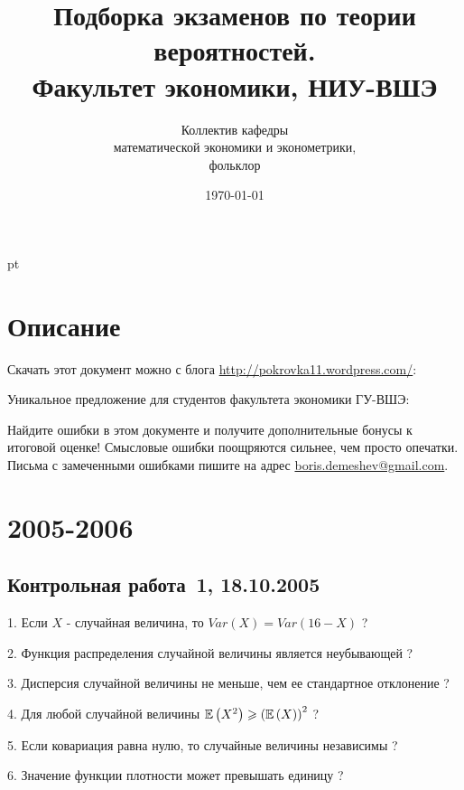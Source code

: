 \documentclass[pdftex,12pt,a4paper]{article}
\title{Подборка экзаменов по теории вероятностей. \\Факультет экономики, НИУ-ВШЭ}
\date{\today}
\author{Коллектив кафедры \\
математической экономики и эконометрики,\\
 фольклор}
\begin{document}
\maketitle

\tableofcontents{}


 pt %

\section{Описание}

Скачать этот документ можно с блога \url{http://pokrovka11.wordpress.com/}:




Уникальное предложение для студентов факультета экономики ГУ-ВШЭ:


Найдите ошибки в этом документе и получите дополнительные бонусы к итоговой оценке! Смысловые ошибки поощряются сильнее, чем просто опечатки. Письма с замеченными ошибками пишите на адрес \href{mailto:boris.demeshev@gmail.com}{boris.demeshev@gmail.com}.



\section{2005-2006}


\subsection{Контрольная работа \No\,1, 18.10.2005}

1. Если  $X$  - случайная величина, то  $Var\left(X\right)=Var\left(16-X\right)$  ?

2. Функция распределения случайной величины является неубывающей ?

3. Дисперсия случайной величины не меньше, чем ее стандартное отклонение ?

4. Для любой случайной величины  $\mathbb{E}\left(X^{2} \right)\geqslant \left(\mathbb{E}\left(X\right)\right)^{2} $  ?

5. Если ковариация равна нулю, то случайные величины независимы ?

6. Значение функции плотности может превышать единицу ?
\end{document}
